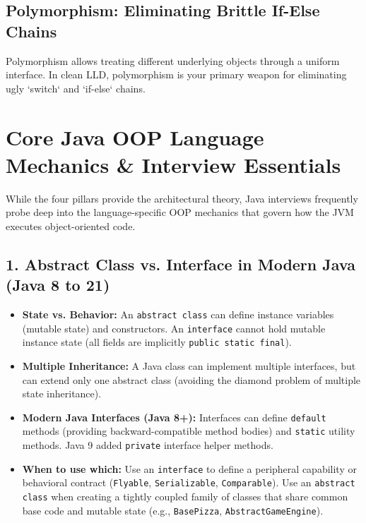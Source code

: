 \documentclass[10pt,journal,compsoc,onecolumn]{IEEEtran}
\begin{document}
\subsection{Polymorphism: Eliminating Brittle If-Else Chains}
Polymorphism allows treating different underlying objects through a uniform interface. In clean LLD, polymorphism is your primary weapon for eliminating ugly `switch` and `if-else` chains.

\section{Core Java OOP Language Mechanics \& Interview Essentials}
\label{sec:java_oop_mechanics}

While the four pillars provide the architectural theory, Java interviews frequently probe deep into the language-specific OOP mechanics that govern how the JVM executes object-oriented code.

\subsection{1. Abstract Class vs. Interface in Modern Java (Java 8 to 21)}
\begin{itemize}
    \item \textbf{State vs. Behavior:} An \texttt{abstract class} can define instance variables (mutable state) and constructors. An \texttt{interface} cannot hold mutable instance state (all fields are implicitly \texttt{public static final}).
    \item \textbf{Multiple Inheritance:} A Java class can implement multiple interfaces, but can extend only one abstract class (avoiding the diamond problem of multiple state inheritance).
    \item \textbf{Modern Java Interfaces (Java 8+):} Interfaces can define \texttt{default} methods (providing backward-compatible method bodies) and \texttt{static} utility methods. Java 9 added \texttt{private} interface helper methods.
    \item \textbf{When to use which:} Use an \texttt{interface} to define a peripheral capability or behavioral contract (\texttt{Flyable}, \texttt{Serializable}, \texttt{Comparable}). Use an \texttt{abstract class} when creating a tightly coupled family of classes that share common base code and mutable state (e.g., \texttt{BasePizza}, \texttt{AbstractGameEngine}).
\end{itemize}
\end{document}
